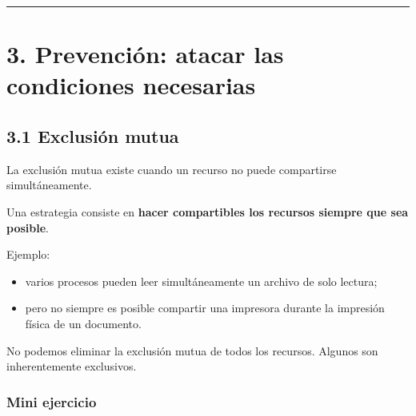 \documentclass[
  spanish,
  letterpaper,
]{scrbook}
\providecommand{\tightlist}{%
  \setlength{\itemsep}{0pt}\setlength{\parskip}{0pt}}
\begin{document}
\begin{center}\rule{0.5\linewidth}{0.5pt}\end{center}


\chapter{3. Prevención: atacar las condiciones
necesarias}\label{prevenciuxf3n-atacar-las-condiciones-necesarias}

\section{3.1 Exclusión mutua}\label{exclusiuxf3n-mutua-1}

La exclusión mutua existe cuando un recurso no puede compartirse
simultáneamente.

Una estrategia consiste en \textbf{hacer compartibles los recursos
siempre que sea posible}.

Ejemplo:

\begin{itemize}
\tightlist
\item
  varios procesos pueden leer simultáneamente un archivo de solo
  lectura;
\item
  pero no siempre es posible compartir una impresora durante la
  impresión física de un documento.
\end{itemize}

\begin{tcolorbox}[enhanced jigsaw, arc=.35mm, bottomrule=.15mm, bottomtitle=1mm, breakable, colback=white, colbacktitle=quarto-callout-warning-color!10!white, colframe=quarto-callout-warning-color-frame, coltitle=black, left=2mm, leftrule=.75mm, opacityback=0, opacitybacktitle=0.6, rightrule=.15mm, title=\textcolor{quarto-callout-warning-color}{\faExclamationTriangle}\hspace{0.5em}{Limitación}, titlerule=0mm, toprule=.15mm, toptitle=1mm]

No podemos eliminar la exclusión mutua de todos los recursos. Algunos
son inherentemente exclusivos.

\end{tcolorbox}

\subsection{Mini ejercicio}\label{mini-ejercicio}
\end{document}
